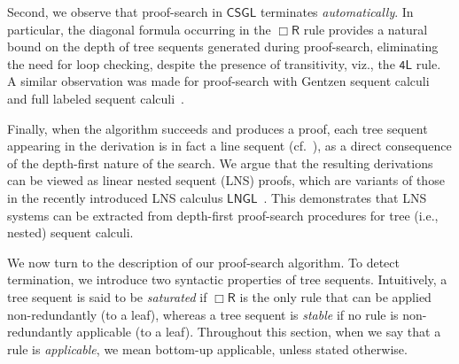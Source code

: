 \documentclass[copyright,creativecommons]{eptcs}
\newcommand{\boxr}{\Box\mathsf{R}}
\newcommand{\fourru}{\mathsf{4L}}
\newcommand{\calc}{\mathsf{CSGL}}
\begin{document}
Second, we observe that proof-search in $\calc$ terminates \emph{automatically}. In particular, the diagonal formula occurring in the $\boxr$ rule provides a natural bound on the depth of tree sequents generated during proof-search, eliminating the need for loop checking, despite the presence of transitivity, viz., the $\fourru$ rule. A similar observation was made for proof-search with Gentzen sequent calculi~\cite{SamVal80} and full labeled sequent calculi~\cite{Neg14}.


Finally, when the algorithm succeeds and produces a proof, each tree sequent appearing in the derivation is in fact a line sequent (cf.~\cite{LelPim15}), as a direct consequence of the depth-first nature of the search. We argue that the resulting derivations can be viewed as linear nested sequent (LNS) proofs, which are variants of those in the recently introduced LNS calculus $\mathsf{LNGL}$~\cite{Lyo25}. This %
demonstrates that LNS systems can be extracted from depth-first proof-search procedures for tree (i.e., nested) sequent calculi.

We now turn to the description of our proof-search algorithm. To detect termination, we introduce two syntactic properties of tree sequents. Intuitively, a tree sequent is said to be \emph{saturated} if $\boxr$ is the only rule that can be applied non-redundantly (to a leaf), whereas a tree sequent is \emph{stable} if no rule is non-redundantly applicable (to a leaf). Throughout this section, when we say that a rule is \emph{applicable}, we %
mean bottom-up applicable, unless stated otherwise. %
\end{document}
